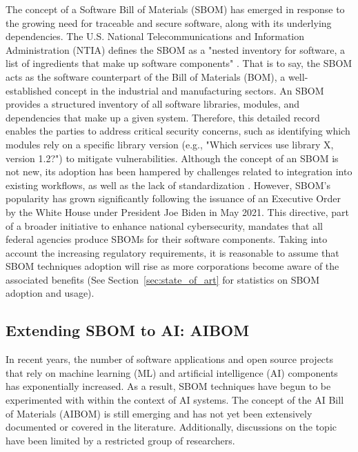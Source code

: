 The concept of a Software Bill of Materials (SBOM) has emerged in response to the growing need for traceable and secure software, along with its underlying dependencies. The U.S. National Telecommunications and Information Administration (NTIA) defines the SBOM as a "nested inventory for software, a list of ingredients that make up software components" \cite{NTIA_SBOM}. That is to say, the SBOM acts as the software counterpart of the Bill of Materials (BOM), a well-established concept in the industrial and manufacturing sectors. An SBOM provides a structured inventory of all software libraries, modules, and dependencies that make up a given system. Therefore, this detailed record enables the parties to address critical security concerns, such as identifying which modules rely on a specific library version (e.g., "Which services use library X, version 1.2?") to mitigate vulnerabilities. Although the concept of an SBOM is not new, its adoption has been hampered by challenges related to integration into existing workflows, as well as the lack of standardization \cite{dalia2024sbom}. However, SBOM's popularity has grown significantly following the issuance of an Executive Order \cite{biden2021} by the White House under President Joe Biden in May 2021. This directive, part of a broader initiative to enhance national cybersecurity, mandates that all federal agencies produce SBOMs for their software components. Taking into account the increasing regulatory requirements, it is reasonable to assume that SBOM techniques adoption will rise as more corporations become aware of the associated benefits (See Section~\ref{sec:state_of_art} for statistics on SBOM adoption and usage).



\subsection{Extending SBOM to AI: AIBOM}

In recent years, the number of software applications and open source projects that rely on machine learning (ML) and artificial intelligence (AI) components has exponentially increased. As a result, SBOM techniques have begun to be experimented with within the context of AI systems. The concept of the AI Bill of Materials (AIBOM) is still emerging and has not yet been extensively documented or covered in the literature. Additionally, discussions on the topic have been limited by a restricted group of researchers.


